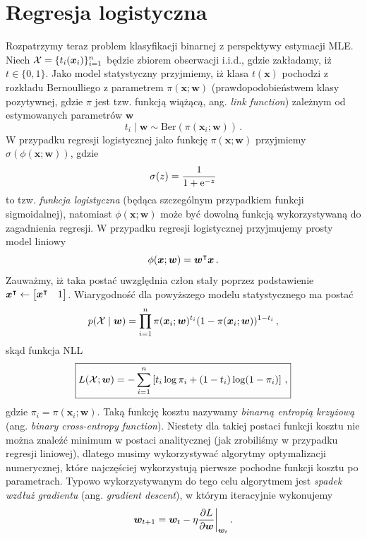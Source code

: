 \documentclass{myclass}
\begin{document}
\section{Regresja logistyczna}

Rozpatrzymy teraz problem klasyfikacji binarnej z perspektywy estymacji MLE. Niech \(\mathcal{X} =
\{t_i(\bm{x}_i)\}_{i=1}^n\) będzie zbiorem obserwacji i.i.d., gdzie zakładamy, iż \(t \in \{0,1\}\).
Jako model statystyczny przyjmiemy, iż klasa \(t(\bm{x})\) pochodzi z rozkładu Bernoulliego z
parametrem \(\pi(\bm{x}; \bm{w})\) (prawdopodobieństwem klasy pozytywnej, gdzie \(\pi\) jest tzw.
funkcją wiążącą, ang. \emph{link function}) zależnym od estymowanych parametrów \(\bm{w}\)
\[
t_i \mid \bm{w} \sim \mathrm{Ber}(\pi(\bm{x}_i; \bm{w}))\,.
\]
W przypadku regresji logistycznej jako funkcję \(\pi(\bm{x}; \bm{w})\) przyjmiemy
\(\sigma(\phi(\bm{x}; \bm{w}))\), gdzie
\[
\sigma(z) = \frac{1}{1 + \mathrm{e}^{-z}}
\]
to tzw. \emph{funkcja logistyczna} (będąca szczególnym przypadkiem funkcji sigmoidalnej), natomiast
\(\phi(\bm{x}; \bm{w})\) może być dowolną funkcją wykorzystywaną do zagadnienia regresji. W
przypadku regresji logistycznej przyjmujemy prosty model liniowy
\[
\phi(\bm{x}; \bm{w}) = \bm{w}^\intercal \bm{x}\,.
\]
Zauważmy, iż taka postać uwzględnia człon stały poprzez podstawienie \(\bm{x}^\tpose \leftarrow
\mqty[\bm{x}^\tpose & 1]\). Wiarygodność dla powyższego modelu statystycznego ma postać
\[
p(\mathcal{X} \mid \bm{w}) = \prod_{i=1}^n \pi(\bm{x}_i;\bm{w})^{t_i} (1 - \pi(\bm{x}_i;\bm{w}))^{1 - t_i}\,,
\]
skąd funkcja NLL
\[
\boxed{
    L(\mathcal{X}; \bm{w}) = - \sum_{i=1}^n \left[ t_i \log \pi_i + (1 - t_i) \log (1 - \pi_i) \right]\,,
}
\]
gdzie \(\pi_i = \pi(\bm{x}_i; \bm{w})\). Taką funkcję kosztu nazywamy \emph{binarną entropią
krzyżową} (ang. \emph{ binary cross-entropy function}). Niestety dla takiej postaci funkcji kosztu
nie można znaleźć minimum w postaci analitycznej (jak zrobiliśmy w przypadku regresji liniowej),
dlatego musimy wykorzystywać algorytmy optymalizacji numerycznej, które najczęściej wykorzystują
pierwsze pochodne funkcji kosztu po parametrach. Typowo wykorzystywanym do tego celu algorytmem jest
\emph{spadek wzdłuż gradientu} (ang. \emph{gradient descent}), w którym iteracyjnie wykonujemy
\[
    \bm{w}_{t+1} = \bm{w}_t - \eta \pdv{L}{\bm{w}}\bigg|_{\bm{w}_t}\,.
\]    
\end{document}
